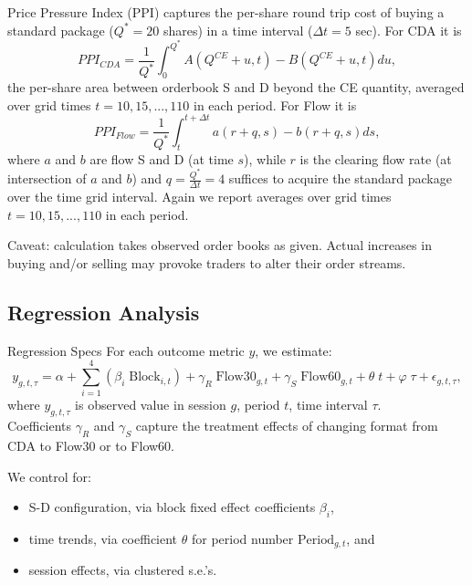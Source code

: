 \documentclass[10pt]{beamer}
\begin{document}
\begin{frame}{Price Pressure Index (PPI)}
captures the per-share round trip  cost of buying a standard package ($Q^*=20$ shares) in a time interval ($\Delta t = 5$ sec). \pause
For CDA it is
\begin{equation} \label{eq:ppicda}
    PPI_{CDA} = \frac{1}{Q^*}\int_0^{Q^*} A(Q^{CE}+u,t) - B(Q^{CE}+u,t) du,
\end{equation}
the per-share area between orderbook S and D beyond the CE quantity, averaged over grid times $t=10, 15, ... , 110$ in each period. \pause
For Flow it is
\begin{equation} \label{eq:ppiflow}
    PPI_{Flow} = \frac{1}{Q^*}\int_t^{t+\Delta t} a(r+q,s) - b(r+q,s) ds,
\end{equation}
where $a$ and $b$ are flow S and D (at time $s$), while $r$ is the clearing flow rate (at intersection of $a$ and $b$) and 
$q=\frac{Q^*}{\Delta t}=4$ suffices to acquire the standard package over the time grid interval. Again we report averages over grid times $t=10, 15, ... , 110$ in each period. \pause

Caveat: calculation takes observed order books as given. Actual increases in buying and/or selling may provoke traders to alter their order streams.
\end{frame}



\subsection{Regression Analysis}

\begin{frame}{Regression Specs}
For each outcome metric $y$, we estimate: 
\begin{equation} \label{eq:reg_price}
    y_{g,t,\tau} = \alpha + \sum^{4}_{i = 1} \left(\beta_i \; \text{Block}_{i,t}\right) + \gamma_R \; \text{Flow30}_{g,t} + \gamma_S \; \text{Flow60}_{g,t}+ \theta \; t + \varphi \; \tau + \epsilon_{g,t, \tau}, 
\end{equation}
where  $y_{g,t,\tau}$ is observed value in session $g$, period $t$, time interval $\tau$. \\
Coefficients $\gamma_R$ and $\gamma_S$ capture the treatment effects of changing format from CDA to Flow30 or to Flow60. \pause

\medskip
We control for: 
\begin{itemize}
\item S-D configuration, via  block fixed effect coefficients $\beta_i$,  
\item time trends, via coefficient $\theta$ for period number $\text{Period}_{g,t}$, and
\item session effects, via clustered s.e.'s.
\end{itemize} \pause
 
\end{frame}
\end{document}
